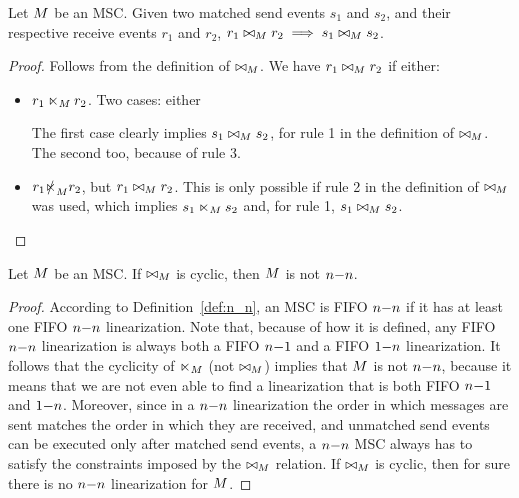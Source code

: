 \begin{proposition}
	Let $M$ be an MSC. Given two matched send events $s_1$ and $s_2$, and their respective receive events $r_1$ and $r_2$, $r_1 \bowtie_M r_2 \implies s_1 \bowtie_M s_2$.
\end{proposition}
\begin{proof}
Follows from the definition of $\bowtie_M$. We have $r_1 \bowtie_M r_2$ if either:
\begin{itemize}\itemsep=0.5ex
	\item $r_1 \ltimes_M r_2$. Two cases: either \begin{enumerate*}[label={(\roman*)}]
		\item $s_1 \nnrel_\msc s_2$, or 
		\item $s_1 \slashed{\nnrel}_\msc s_2$.
	\end{enumerate*}
	The first case clearly implies $s_1 \bowtie_M s_2$, for rule 1 in the definition of $\bowtie_M$. The second too, because of rule 3.
	\item  $r_1 \slashed{\ltimes}_M r_2$, but $r_1 \bowtie_M r_2$. This is only possible if rule 2 in the definition of $\bowtie_M$ was used, which implies $s_1 \nnrel_\msc s_2$ and, for rule 1, $s_1 \bowtie_M s_2$.
\end{itemize}
\end{proof}

\begin{proposition}\label{prop:n_n_cycl}
	Let $M$ be an MSC. If $\bowtie_M$ is cyclic, then $M$ is not $n\mathsf{-}n$.
\end{proposition}
\begin{proof}
According to Definition~\ref{def:n_n}, an MSC is FIFO $n\mathsf{-}n$ if it has at least one FIFO $n\mathsf{-}n$ linearization. Note that, because of how it is defined, any FIFO $n\mathsf{-}n$ linearization is always both a FIFO $n\mathsf{-}1$ and a FIFO $1\mathsf{-}n$ linearization. It follows that the cyclicity of $\ltimes_M$ (not $\bowtie_M$) implies that $M$ is not $n\mathsf{-}n$, because it means that we are not even able to find a linearization that is both FIFO $n\mathsf{-}1$ and $1\mathsf{-}n$. Moreover, since in a $n\mathsf{-}n$ linearization the order in which messages are sent matches the order in which they are received, and unmatched send events can be executed only after matched send events, a $n\mathsf{-}n$ MSC always has to satisfy the constraints imposed by the $\bowtie_M$ relation. If $\bowtie_M$ is cyclic, then for sure there is no $n\mathsf{-}n$ linearization for $M$.
\end{proof}

